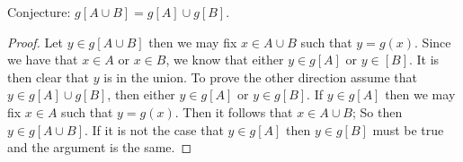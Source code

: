 \documentclass[11pt,largemargins]{homework}
\begin{document}
\begin{alphaparts}
    Conjecture: $g[A \cup B] = g[A] \cup g[B]$. 

    \begin{proof}
        Let $y \in g[A \cup B]$ then we may fix $x \in A \cup B$ such that $y = g(x)$. Since we have that $x \in A$ or $x \in B$, we know that either $y \in g[A] $ or $y \in [B]$. It is then clear that $y$ is in the union. 
        To prove the other direction assume that $y \in g[A] \cup g[B]$, then either $y \in g[A] $ or $y \in g[B]$. If $y \in g[A]$ then we may fix $x \in A$ such that $y = g(x)$. Then it follows that $x \in A \cup B$; So then $y \in g[A \cup B]$. If it is not the case 
        that $y \in g[A]$ then $y \in g[B]$ must be true and the argument is the same. 
    \end{proof}



\end{alphaparts}

\question
\end{document}
